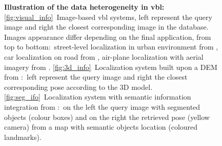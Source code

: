 \begin{figure}[t]
\begin{minipage}[b]{0.55\linewidth}
	\end{minipage}
	\caption[Illustration of the data heterogeneity in \ac{vbl}]{\textbf{Illustration of the data heterogeneity in \ac{vbl}:} \ref{fig:visual_info}~Image-based \ac{vbl} systems, left represent the query image and right the closest corresponding image in the database. Images appearance differ depending on the final application, from top to bottom:~street-level localization in urban environment from \citep{Torii2015}, car localization on road from \citep{Milford2012}, air-plane localization with aerial imagery from \citep{Wan2016}. \ref{fig:3d_info}~Localization system built upon a DEM from \citep{Matei2013}:~left represent the query image and right the closest corresponding pose according to the 3D model. \ref{fig:seg_ifo}~Localization system with semantic information integration from \citep{Ardeshir2014}:~on the left the query image with segmented objects (colour boxes) and on the right the retrieved pose (yellow camera) from a map with semantic objects location (coloured landmarks). \label{fig:data_div}}
\end{figure}